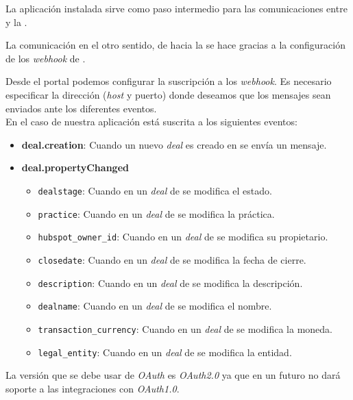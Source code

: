 La aplicación instalada sirve como paso intermedio para las comunicaciones entre \hs{} y la \iface{}.

La comunicación en el otro sentido, de \hs{} hacia la \iface{} se hace gracias a la configuración de los \textit{webhook} de \hs{}.

Desde el portal podemos configurar la suscripción a los \textit{webhook}. Es necesario especificar la dirección (\textit{host} y puerto) donde deseamos que los mensajes sean enviados ante los diferentes eventos.\\

En el caso de nuestra aplicación está suscrita a los siguientes eventos:
\begin{itemize}
	\item \textbf{deal.creation}: Cuando un nuevo \textit{deal} es creado en \hs{} se envía un mensaje.
	\item \textbf{deal.propertyChanged} 
		\begin{itemize}
			\item \texttt{dealstage}: Cuando en un \textit{deal} de \hs{} se modifica el estado.
			\item \texttt{practice}: Cuando en un \textit{deal} de \hs{} se modifica la práctica.
			\item \texttt{hubspot\_owner\_id}: Cuando en un \textit{deal} de \hs{} se modifica su propietario.
			\item \texttt{closedate}: Cuando en un \textit{deal} de \hs{} se modifica la fecha de cierre.
			\item \texttt{description}: Cuando en un \textit{deal} de \hs{} se modifica la descripción.
			\item \texttt{dealname}: Cuando en un \textit{deal} de \hs{} se modifica el nombre.
			\item \texttt{transaction\_currency}: Cuando en un \textit{deal} de \hs{} se modifica la moneda.
			\item \texttt{legal\_entity}: Cuando en un \textit{deal} de \hs{} se modifica la entidad.
		\end{itemize}
\end{itemize}

La versión que se debe usar de \textit{OAuth} es \textit{OAuth2.0} ya que \hs{} en un futuro no dará soporte a las integraciones con \textit{OAuth1.0}.


\section{\wday{}}

